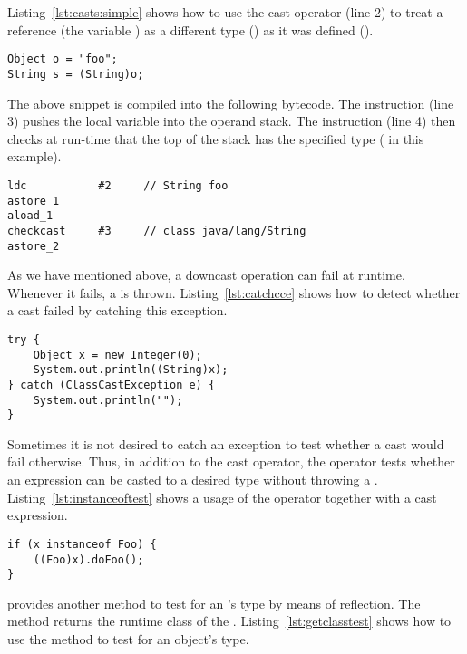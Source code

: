 Listing~\ref{lst:casts:simple} shows how to use the cast operator (line 2) to treat a reference (the variable ) as a different type () as it was defined ().

\begin{lstlisting}[style=java,label=lst:casts:simple,caption=Variable \code{o} (defined as \code{Object}) is cast to \code{String}.]
Object o = "foo"; 
String s = (String)o;
\end{lstlisting}

The above snippet is compiled into the following \java{} bytecode.
The  instruction (line 3) pushes the local variable  into the operand stack.
The  instruction (line 4) then checks at run-time that the top of the stack has the specified type ( in this example).

\begin{lstlisting}[style=bytecode]
ldc           #2     // String foo
astore_1
aload_1
checkcast     #3     // class java/lang/String
astore_2
\end{lstlisting}

As we have mentioned above, a downcast operation can fail at runtime.
Whenever it fails, a  is thrown.
Listing~\ref{lst:catchcce} shows how to detect whether a cast failed by catching this exception.

\begin{lstlisting}[style=java,label=lst:catchcce,caption={Catching \code{ClassCastException}}]
try {
	Object x = new Integer(0);
	System.out.println((String)x); 
} catch (ClassCastException e) { 
	System.out.println(""); 
} 
\end{lstlisting}

Sometimes it is not desired to catch an exception to test whether a cast would fail otherwise. 
Thus, in addition to the cast operator, the  operator tests whether an expression can be casted to a desired type without throwing a .
Listing~\ref{lst:instanceoftest} shows a usage of the  operator together with a cast expression.

\begin{lstlisting}[style=java,label=lst:instanceoftest,caption=Runtime type test using \code{instanceof} before applying a cast.]
if (x instanceof Foo) {
	((Foo)x).doFoo();
}
\end{lstlisting}

\java{} provides another method to test for an 's type by means of reflection.
The  method returns the runtime class of the .
Listing~\ref{lst:getclasstest} shows how to use the  method to test for an object's type.

